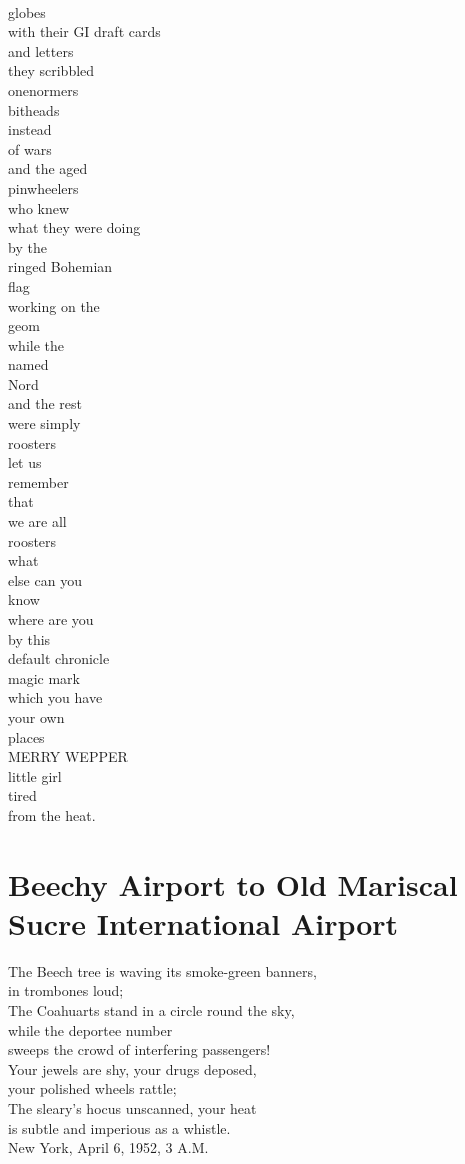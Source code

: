 \documentclass[smalldemyvopaper,11pt,twoside,onecolumn,openright,extrafontsizes]{memoir}
\begin{document}
\\globes
\\with their GI draft cards
\\and letters
\\they scribbled
\\onenormers
\\bitheads
\\instead
\\of wars
\\and the aged
\\pinwheelers
\\who knew
\\what they were doing
\\by the
\\ringed Bohemian
\\flag
\\working on the
\\geom
\\while the
\\named
\\Nord
\\and the rest
\\were simply
\\roosters
\\let us
\\remember
\\that
\\we are all
\\roosters
\\what
\\else can you
\\know
\\where are you
\\by this
\\default chronicle
\\magic mark
\\which you have
\\your own
\\places
\\MERRY WEPPER
\\little girl
\\tired
\\from the heat.



\chapter{Beechy Airport to Old Mariscal Sucre International Airport}
The Beech tree is waving its smoke-green banners,
\\in trombones loud;
\\The Coahuarts stand in a circle round the sky,
\\while the deportee number
\\sweeps the crowd of interfering passengers!
\\Your jewels are shy, your drugs deposed,
\\your polished wheels rattle;
\\The sleary's hocus unscanned, your heat
\\is subtle and imperious as a whistle.
\\New York, April 6, 1952, 3 A.M.
\end{document}
